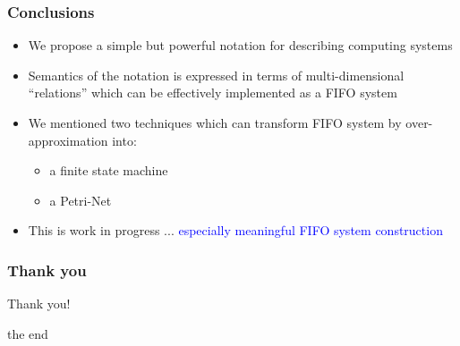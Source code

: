 \documentclass[utf8]{beamer}
\newcommand{\mypause}{\pause}
\begin{document}
\begin{frame}
  \frametitle{Conclusions}
  \begin{itemize}
  \item We propose a simple but powerful notation for describing
    computing systems \mypause
  \item Semantics of the notation is expressed in terms of
    multi-dimensional ``relations'' which can be effectively
    implemented as a FIFO system \mypause
  \item We mentioned two techniques which can transform FIFO system by
    over-approximation into:
    \begin{itemize}
    \item a finite state machine
    \item a Petri-Net
    \end{itemize} 
    \mypause
  \item This is work in progress ... \textcolor{blue}{especially
      meaningful FIFO system construction}
\end{itemize}
\end{frame}

\begin{frame}
\frametitle{Thank you}

Thank you! \mypause
\end{frame}
the end 
\end{document}
